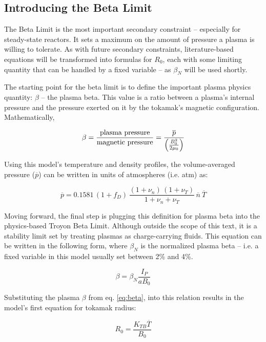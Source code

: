 \subsection{Introducing the Beta Limit}

The Beta Limit is the most important secondary constraint -- especially for steady-state reactors. It sets a maximum on the amount of pressure a plasma is willing to tolerate. As with future secondary constraints, literature-based equations will be transformed into formulas for $R_0$, each with some limiting quantity that can be handled by a fixed variable -- as $\beta_N$ will be used shortly.

The starting point for the beta limit is to define the important plasma physics quantity: $\beta$ -- the plasma beta. This value is a ratio between a plasma's internal pressure and the pressure exerted on it by the tokamak's magnetic configuration. Mathematically,

\begin{equation}
	\label{eq:beta}
	\beta = \frac{\textnormal{plasma pressure}}{\textnormal{magnetic pressure}} = \frac{ \overline p }{ \left( \frac{B_0^2}{2 \mu_0} \right) }
\end{equation}

Using this model's temperature and density profiles, the volume-averaged pressure ($\overline p$) can be written in units of atmospheres (i.e. atm) as:

\begin{equation}
  \overline{p} = 0.1581 \, ( 1 + f_D ) \, \frac{ (1 + \nu_n) \, (1 + \nu_T) }{1 + \nu_n + \nu_T } \, \overline{n} \ \overline{T}
\end{equation}

Moving forward, the final step is plugging this definition for plasma beta into the physics-based Troyon Beta Limit. Although outside the scope of this text, it is a stability limit set by treating plasmas as charge-carrying fluids. This equation can be written in the following form, where $\beta_N$ is the normalized plasma beta -- i.e. a fixed variable in this model usually set between 2\% and 4\%.

\begin{equation}
	\beta = \beta_N \frac{ I_P }{ a B_0 }
\end{equation}

Substituting the plasma $\beta$ from eq. \ref{eq:beta}, into this relation results in the model's first equation for tokamak radius:

\begin{equation}
  R_0 = \frac{ K_{TB} \overline{T} }{ B_0 }
\end{equation}

